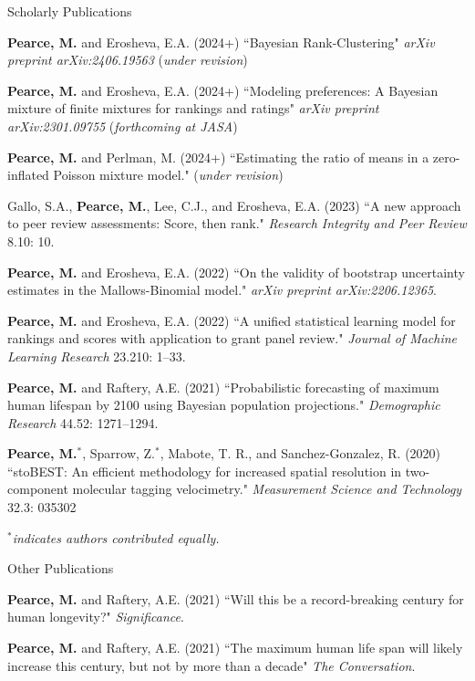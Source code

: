 \documentclass{resume} %
\begin{document}
\begin{rSection}{Scholarly Publications}

\textbf{Pearce, M.} and Erosheva, E.A. (2024+) ``Bayesian Rank-Clustering" \textit{arXiv preprint arXiv:2406.19563} (\textit{under revision})

\textbf{Pearce, M.} and Erosheva, E.A. (2024+) ``Modeling preferences: A Bayesian mixture of finite mixtures for rankings and ratings" \textit{arXiv preprint arXiv:2301.09755} (\textit{forthcoming at JASA})

\textbf{Pearce, M.} and Perlman, M. (2024+) ``Estimating the ratio of means in a zero-inflated Poisson mixture model." (\textit{under revision})

Gallo, S.A., \textbf{Pearce, M.}, Lee, C.J., and Erosheva, E.A. (2023) ``A new approach to peer review assessments: Score, then rank." \textit{Research Integrity and Peer Review} 8.10: 10.

\textbf{Pearce, M.} and Erosheva, E.A. (2022) ``On the validity of bootstrap uncertainty estimates in the Mallows-Binomial model." \textit{arXiv preprint arXiv:2206.12365}.

\textbf{Pearce, M.} and Erosheva, E.A. (2022) ``A unified statistical learning model for rankings and scores with application to grant panel review." \textit{Journal of Machine Learning Research} 23.210: 1--33.

\textbf{Pearce, M.} and Raftery, A.E. (2021) ``Probabilistic forecasting of maximum human lifespan by 2100 using Bayesian population projections." {\em Demographic Research} 44.52: 1271--1294.

\textbf{Pearce, M.}$^*$, Sparrow, Z.$^*$, Mabote, T. R., and Sanchez-Gonzalez, R. (2020) ``stoBEST: An efficient methodology for increased spatial resolution in two-component molecular tagging velocimetry." {\em Measurement Science and Technology} 32.3: 035302

{\em $^*$indicates authors contributed equally.}
\end{rSection}

\begin{rSection}{Other Publications}

\textbf{Pearce, M.} and Raftery, A.E. (2021) ``Will this be a record-breaking century for human longevity?" {\em Significance}.

\textbf{Pearce, M.} and Raftery, A.E. (2021) ``The maximum human life span will likely increase this century, but not by more than a decade" {\em The Conversation}.

\end{rSection}
\end{document}
